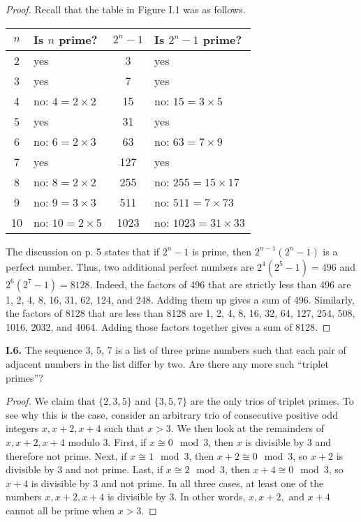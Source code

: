 \documentclass[12pt]{amsart}
\newenvironment{statement}[1]{\smallskip\noindent\color[rgb]{.6627, .3529, .6314} {\bf #1.}}{}
\theoremstyle{definition}
\theoremstyle{remark}
\begin{document}
\begin{proof}
Recall that the table in Figure I.1 was as follows.
\begin{center}
	\begin{tabular}{c | l | c | l}
		$n$ & Is $n$ prime? & $2^n - 1$ & Is $2^n - 1$ prime? \\
		\hline
		2 & yes & 3 & yes \\
		3 & yes & 7 & yes \\
		4 & no: $4 = 2 \times 2$ & 15 & no: $15 = 3 \times 5$ \\
		5 & yes & 31 & yes \\
		6 & no: $6 = 2 \times 3$ & 63 & no: $63 = 7 \times 9$ \\
		7 & yes & 127 & yes \\
		8 & no: $8 = 2 \times 2$ & 255 & no: $255 = 15 \times 17$ \\
		9 & no: $9 = 3 \times 3$ & 511 & no: $511 = 7 \times 73$ \\
		10 & no: $10 = 2 \times 5$ & 1023 & no: $1023 = 31 \times 33$
	\end{tabular}
\end{center}
The discussion on p. 5 states that if $2^n - 1$ is prime, then $2^{n - 1} (2^n - 1)$ is a perfect number.
Thus, two additional perfect numbers are $2^4 (2^5 - 1) = 496$ and $2^6 (2^7 - 1) = 8128$.
Indeed, the factors of 496 that are strictly less than 496 are 1, 2, 4, 8, 16, 31, 62, 124, and 248.
Adding them up gives a sum of 496.
Similarly, the factors of 8128 that are less than 8128 are 1, 2, 4, 8, 16, 32, 64, 127, 254, 508, 1016, 2032, and 4064.
Adding those factors together gives a sum of 8128.
\end{proof}


\begin{statement}{I.6}
The sequence 3, 5, 7 is a list of three prime numbers such that each pair of adjacent numbers in the list differ by two.
Are there any more such ``triplet primes''?
\end{statement}

\begin{proof}
We claim that $\{2, 3, 5\}$ and $\{3, 5, 7\}$ are the only trios of triplet primes.
To see why this is the case, consider an arbitrary trio of consecutive positive odd integers $x, x + 2, x + 4$ such that $x > 3$.
We then look at the remainders of $x, x + 2, x + 4$ modulo 3.
First, if $x \cong 0 \mod 3$, then $x$ is divisible by 3 and therefore not prime.
Next, if $x \cong 1 \mod 3$, then $x + 2 \cong 0 \mod 3$, so $x + 2$ is divisible by 3 and not prime.
Last, if $x \cong 2 \mod 3$, then $x + 4 \cong 0 \mod 3$, so $x + 4$ is divisible by 3 and not prime.
In all three cases, at least one of the numbers $x, x + 2, x + 4$ is divisible by 3.
In other words, $x, x + 2, \text{ and } x + 4$ cannot all be prime when $x > 3$.
\end{proof}
\end{document}
